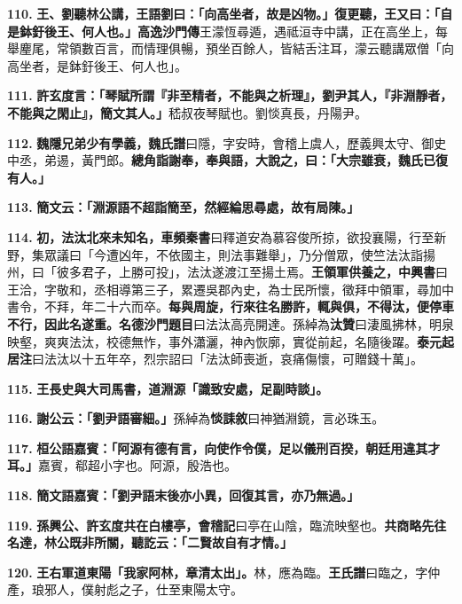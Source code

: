 \textbf{110.} \textbf{王、劉聽林公講，王語劉曰：「向高坐者，故是凶物。」復更聽，王又曰：「自是鉢釪後王、何人也。」}{\footnotesize \textbf{高逸沙門傳}王濛恆尋遁，遇祗洹寺中講，正在高坐上，每舉麈尾，常領數百言，而情理俱暢，預坐百餘人，皆結舌注耳，濛云聽講眾僧「向高坐者，是鉢釪後王、何人也」。}

\textbf{111.} \textbf{許玄度言：「琴賦所謂『非至精者，不能與之析理』，劉尹其人，『非淵靜者，不能與之閑止』，簡文其人。」}{\footnotesize 嵇叔夜琴賦也。劉惔真長，丹陽尹。}

\textbf{112.} \textbf{魏隱兄弟少有學義，}{\footnotesize \textbf{魏氏譜}曰隱，字安時，會稽上虞人，歷義興太守、御史中丞，弟逷，黃門郎。}\textbf{總角詣謝奉，奉與語，大說之，曰：「大宗雖衰，魏氏已復有人。」}

\textbf{113.} \textbf{簡文云：「淵源語不超詣簡至，然經綸思尋處，故有局陳。」}

\textbf{114.} \textbf{初，法汰北來未知名，}{\footnotesize \textbf{車頻秦書}曰釋道安為慕容俊所掠，欲投襄陽，行至新野，集眾議曰「今遭凶年，不依國主，則法事難舉」，乃分僧眾，使竺法汰詣揚州，曰「彼多君子，上勝可投」，法汰遂渡江至揚土焉。}\textbf{王領軍供養之，}{\footnotesize \textbf{中興書}曰王洽，字敬和，丞相導第三子，累遷吳郡內史，為士民所懷，徵拜中領軍，尋加中書令，不拜，年二十六而卒。}\textbf{每與周旋，行來往名勝許，輒與俱，不得汰，便停車不行，因此名遂重。}{\footnotesize \textbf{名德沙門題目}曰法汰高亮開達。孫綽為\textbf{汰贊}曰淒風拂林，明泉映壑，爽爽法汰，校德無怍，事外瀟灑，神內恢廓，實從前起，名隨後躍。\textbf{泰元起居注}曰法汰以十五年卒，烈宗詔曰「法汰師喪逝，哀痛傷懷，可贈錢十萬」。}

\textbf{115.} \textbf{王長史與大司馬書，道淵源「識致安處，足副時談」。}

\textbf{116.} \textbf{謝公云：「劉尹語審細。」}{\footnotesize 孫綽為\textbf{惔誄敘}曰神猶淵鏡，言必珠玉。}

\textbf{117.} \textbf{桓公語嘉賓：「阿源有德有言，向使作令僕，足以儀刑百揆，朝廷用違其才耳。」}{\footnotesize 嘉賓，郗超小字也。阿源，殷浩也。}

\textbf{118.} \textbf{簡文語嘉賓：「劉尹語末後亦小異，回復其言，亦乃無過。」}

\textbf{119.} \textbf{孫興公、許玄度共在白樓亭，}{\footnotesize \textbf{會稽記}曰亭在山陰，臨流映壑也。}\textbf{共商略先往名達，林公既非所關，聽訖云：「二賢故自有才情。」}

\textbf{120.} \textbf{王右軍道東陽「我家阿林，章清太出」。}{\footnotesize 林，應為臨。\textbf{王氏譜}曰臨之，字仲產，琅邪人，僕射彪之子，仕至東陽太守。}

